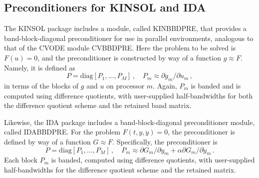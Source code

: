 \subsection{Preconditioners for KINSOL and IDA}

The KINSOL package includes a module, called KINBBDPRE, that provides
a band-block-diagonal preconditioner for use in parallel environments,
analogous to that of the CVODE module CVBBDPRE.  Here the problem to
be solved is $F(u) = 0$, and the preconditioner is constructed by way
of a function $g \approx F$.  Namely, it is defined as
\begin{equation*}
  P = \mbox{diag}[P_1,\ldots,P_M] \, , \quad
  P_m \approx \partial g_m / \partial u_m \, ,
\end{equation*}
in terms of the blocks of $g$ and $u$ on processor $m$.  Again, $P_m$
is banded and is computed using difference quotients, with user-supplied
half-bandwidths for both the difference quotient scheme and the
retained band matrix.

Likewise, the IDA package includes a
band-block-diagonal preconditioner module, called IDABBDPRE.  For the
problem $F(t,y,{\dot y}) = 0$, the preconditioner is defined by way of a
function $G \approx F$.  Specifically, the preconditioner is
\begin{equation*}
  P = \mbox{diag}[P_1,\ldots,P_M] \, ,
  \quad P_m \approx \partial G_m / \partial y_m
  + \alpha \partial G_m / \partial {\dot y}_m \, .
\end{equation*}
Each block $P_m$ is banded, computed using difference quotients, with
user-supplied half-bandwidths for the difference quotient scheme and
the retained matrix.
